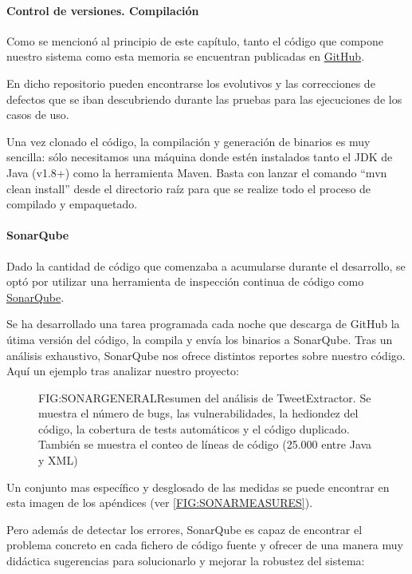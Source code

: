 \paragraph{Control de versiones. Compilación}
Como se mencionó al principio de este capítulo, tanto el código que compone nuestro sistema como esta memoria se encuentran publicadas en \href{https://github.com/plyskor/TweetExtractor}{GitHub}. 

En dicho repositorio pueden encontrarse los evolutivos y las correcciones de defectos que se iban descubriendo durante las pruebas para las ejecuciones de los casos de uso.
 
 Una vez clonado el código, la compilación y generación de binarios es muy sencilla: sólo necesitamos una máquina donde estén instalados tanto el JDK de Java (v1.8+) como la herramienta Maven. Basta con lanzar el comando ``mvn clean install'' desde el directorio raíz para que se realize todo el proceso de compilado y empaquetado.
 
\paragraph{SonarQube}
Dado la cantidad de código que comenzaba a acumularse durante el desarrollo, se optó por utilizar una herramienta de inspección continua de código como \href{https://www.sonarqube.org/}{SonarQube}. 

Se ha desarrollado una tarea programada cada noche que descarga de GitHub la útima versión del código, la compila y envía los binarios a SonarQube. Tras un análisis exhaustivo, SonarQube nos ofrece distintos reportes sobre nuestro código. Aquí un ejemplo tras analizar nuestro proyecto:

\begin{figure}[Reporte general SonarQube]{FIG:SONARGENERAL}{Resumen del análisis de TweetExtractor. Se muestra el número de bugs, las vulnerabilidades, la hediondez del código, la cobertura de tests automáticos y el código duplicado. También se muestra el conteo de líneas de código (25.000 entre Java y XML)}
\end{figure}

Un conjunto mas específico y desglosado de las medidas se puede encontrar en esta imagen de los apéndices (ver \ref{FIG:SONARMEASURES}). 

Pero además de detectar los errores, SonarQube es capaz de encontrar el problema concreto en cada fichero de código fuente y ofrecer de una manera muy didáctica sugerencias para solucionarlo y mejorar la robustez del sistema:

